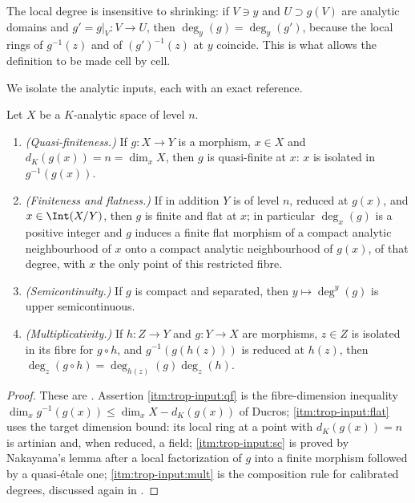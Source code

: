 The local degree is insensitive to shrinking: if $V\ni y$ and $U\supset g(V)$
are analytic domains and $g'=g|_V:V\to U$, then $\deg_y(g)=\deg_y(g')$,
because the local rings of $g^{-1}(z)$ and of $(g')^{-1}(z)$ at $y$
coincide. This is what allows the definition to be made cell by cell.

We isolate the analytic inputs, each with an exact reference.

\begin{proposition}
\label{prop:trop-analytic-inputs}
Let $X$ be a $K$-analytic space of level $n$.
\begin{enumerate}
\item\label{itm:trop-input:qf} \emph{(Quasi-finiteness.)} If
  $g:X\to Y$ is a morphism, $x\in X$ and $d_K(g(x))=n=\dim_xX$, then $g$ is
  quasi-finite at $x$: $x$ is isolated in $g^{-1}(g(x))$.
\item\label{itm:trop-input:flat} \emph{(Finiteness and flatness.)} If in
  addition $Y$ is of level $n$, reduced at $g(x)$, and
  $x\in\Int(X/Y)$, then $g$ is finite and flat
  at $x$; in particular $\deg_x(g)$ is a positive integer and $g$ induces a
  finite flat morphism of a compact analytic neighbourhood of $x$ onto a
  compact analytic neighbourhood of $g(x)$, of that degree, with $x$ the
  only point of this restricted fibre.
\item\label{itm:trop-input:sc} \emph{(Semicontinuity.)} If $g$ is compact
  and separated, then $y\mapsto\deg^y(g)$ is upper semicontinuous.
\item\label{itm:trop-input:mult} \emph{(Multiplicativity.)} If
  $h:Z\to Y$ and $g:Y\to X$ are morphisms, $z\in Z$ is isolated in its
  fibre for $g\circ h$, and $g^{-1}(g(h(z)))$ is reduced at $h(z)$, then
  $\deg_z(g\circ h)=\deg_{h(z)}(g)\deg_z(h)$.
\end{enumerate}
\end{proposition}

\begin{proof}
These are \cite[Lemma~11.5.1, Lemma~11.6.5, Proposition~13.4.2 and
Proposition~13.3.10]{CLD25}. Assertion \cref{itm:trop-input:qf} is the
fibre-dimension inequality
$\dim_xg^{-1}(g(x))\le\dim_xX-d_K(g(x))$ of Ducros; \cref{itm:trop-input:flat}
uses the target dimension bound: its local ring at a point with
$d_K(g(x))=n$ is artinian and,
when reduced, a field; \cref{itm:trop-input:sc} is proved by
Nakayama's lemma after a local factorization of $g$ into a finite morphism
followed by a quasi-\'etale one; \cref{itm:trop-input:mult} is the
composition rule for calibrated degrees, discussed again in
.
\end{proof}

